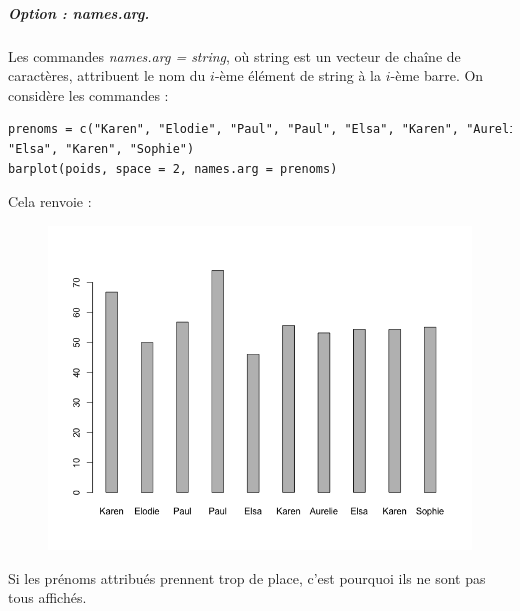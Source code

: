 \subparagraph{Option : names.arg.} Les commandes \textit{names.arg = string}, où string est un vecteur de chaîne de caractères, attribuent le nom du $i$-ème élément de string à la $i$-ème barre.
On considère les commandes :
\begin{lstlisting}[language=html]
prenoms = c("Karen", "Elodie", "Paul", "Paul", "Elsa", "Karen", "Aurelie",
"Elsa", "Karen", "Sophie")
barplot(poids, space = 2, names.arg = prenoms)
\end{lstlisting}
Cela renvoie :
\begin{figure}[H]\begin{center}\includegraphics[scale=0.4]{ilu/gra37.png}\end{center}\end{figure}
Si les prénoms attribués prennent trop de place, c'est pourquoi ils ne sont pas tous affichés. 
